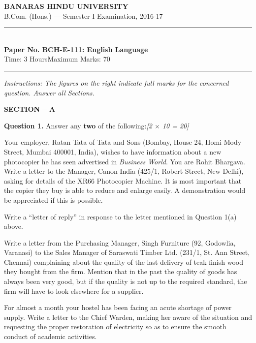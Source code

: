 \documentclass[11pt,a4paper]{article}
\newcommand{\pts}[1]{\hfill   \textit{[#1]}}
\begin{document}
\begin{center}
  {\large\bfseries BANARAS HINDU UNIVERSITY}\\[2pt]
  {\normalsize B.Com. (Hons.) --- Semester I Examination, 2016-17}\\[6pt]
  \rule{0.8\linewidth}{0.5pt}\\[6pt]
  {\large\bfseries Paper No. BCH-E-111: English Language}\\[4pt]
  {\normalsize Time: 3 Hours\hfill Maximum Marks: 70}
\end{center}

\rule{\linewidth}{0.4pt}

\smallskip



\noindent   \textit{Instructions: The figures on the right indicate full marks for the concerned question. Answer all Sections.}

\bigskip


\begin{center}
   \textbf{\large SECTION -- A}
\end{center}




\noindent   \textbf{Question 1.} Answer any   \textbf{two} of the following:\pts{2 $ \times$ 10 = 20}

\begin{parts}
  \item Your employer, Ratan Tata of Tata and Sons (Bombay, House 24, Homi Mody Street, Mumbai 400001, India), wishes to have information about a new photocopier he has seen advertised in   \textit{Business World}. You are Rohit Bhargava. Write a letter to the Manager, Canon India (425/1, Robert Street, New Delhi), asking for details of the XR66 Photocopier Machine. It is most important that the copier they buy is able to reduce and enlarge easily. A demonstration would be appreciated if this is possible.
  \item Write a ``letter of reply'' in response to the letter mentioned in Question 1(a) above.
  \item Write a letter from the Purchasing Manager, Singh Furniture (92, Godowlia, Varanasi) to the Sales Manager of Saraswati Timber Ltd. (231/1, St. Ann Street, Chennai) complaining about the quality of the last delivery of teak finish wood they bought from the firm. Mention that in the past the quality of goods has always been very good, but if the quality is not up to the required standard, the firm will have to look elsewhere for a supplier.
  \item For almost a month your hostel has been facing an acute shortage of power supply. Write a letter to the Chief Warden, making her aware of the situation and requesting the proper restoration of electricity so as to ensure the smooth conduct of academic activities.
\end{parts}
\end{document}
